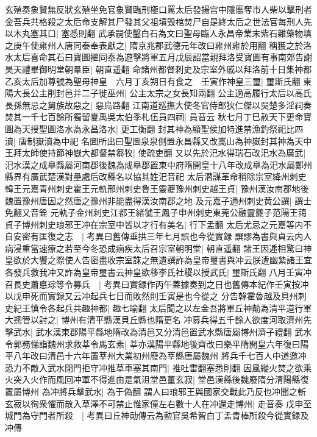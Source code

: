 玄殖奏象賢無反狀玄殖坐免官象賢臨刑極口罵太后發揚宫中隱慝奪市人柴以擊刑者金吾兵共格殺之太后命支解其尸發其父祖墳毁棺焚尸自是終太后之世法官每刑人先以木丸塞其口|{
	塞悉則翻}
武承嗣使鑿白石為文曰聖母臨人永昌帝業末紫石雜藥物填之庚午使雍州人唐同泰奉表獻之|{
	隋京兆郡武德元年改曰雍州雍於用翻}
稱獲之於洛水太后喜命其石曰寶圖擢同泰為遊擊將軍五月戊辰詔當親拜洛受寶圖有事南郊告謝昊天禮畢御明堂朝羣臣|{
	朝直遥翻}
命諸州都督刺史及宗室外戚以拜洛前十日集神都乙亥太后加尊號為聖母神皇　六月丁亥朔日有食之　壬寅作神皇三璽|{
	璽斯氏翻}
東陽大長公主削封邑并二子徙巫州|{
	公主太宗之女長知兩翻}
公主適高履行太后以高氏長孫無忌之舅族故惡之|{
	惡烏路翻}
江南道廵撫大使冬官侍郎狄仁傑以吳楚多淫祠奏焚其一千七百餘所獨留夏禹吳太伯季札伍員四祠|{
	員音云}
秋七月丁巳赦天下更命寶圖為天授聖圖洛水為永昌洛水|{
	更工衡翻}
封其神為顯聖侯加特進禁漁釣祭祀比四瀆|{
	唐制嶽瀆為中祀}
名圖所出曰聖圖泉泉側置永昌縣又改嵩山為神嶽封其神為天中王拜太師使持節神嶽大都督禁芻牧|{
	使疏吏翻}
又以先於汜水得瑞石改汜水為廣武|{
	汜水漢之成臯縣屬河南郡後魏為成臯郡置東中府隋開皇十八年改成臯為汜水屬鄭州縣界有廣武楚漢對壘處后改縣名以協其姓汜音祀}
太后潜謀革命稍除宗室絳州刺史韓王元嘉青州刺史霍王元軌邢州刺史魯王靈夔豫州刺史越王貞|{
	豫州漢汝南郡地後魏置豫州唐因之然唐之豫州非能盡得漢汝南郡之地}
及元嘉子通州刺史黄公譔|{
	譔士免翻又音銓}
元軌子金州刺史江都王緒虢王鳳子申州刺史東莞公融靈夔子范陽王藹貞子博州刺史琅邪王冲在宗室中皆以才行有美名|{
	行下孟翻}
太后尤忌之元嘉等内不自安密有匡復之志　|{
	考異曰舊傳垂拱三年七月誤也今從實録}
譔謬為書與貞云内人病浸重當速療之若至今冬恐成痼疾太后召宗室朝明堂|{
	朝直遥翻}
諸王因逓相驚曰神皇欲於大饗之際使人告密盡收宗室誅之無遺譔詐為皇帝璽書與冲云朕遭幽縶諸王宜各發兵救我冲又詐為皇帝璽書云神皇欲移李氏社稷以授武氏|{
	璽斯氏翻}
八月壬寅冲召長史蕭悳琮等令募兵　|{
	考異曰實録作丙午蓋據奏到之日也舊傳本紀作壬寅按冲以戊申死而實録又云冲起兵七日而敗然則壬寅是也今從之}
分告韓霍魯越及貝州刺史紀王慎令各起兵共趣神都|{
	趣七喻翻}
太后聞之以左金吾將軍丘神勣為清平道行軍大摠管以討之|{
	博州有清平縣漢貝丘縣也隋更名}
冲募兵得五千餘人欲度河取濟州先擊武水|{
	武水漢東郡陽平縣地隋改為清邑又分清邑置武水縣唐屬博州濟子禮翻}
武水令郭務悌詣魏州求救莘令馬玄素|{
	莘亦漢陽平縣地後齊改曰樂平隋開皇六年復曰陽平八年改曰清邑十六年置莘州大業初州廢為莘縣唐屬魏州}
將兵千七百人中道邀冲恐力不敵入武水閉門拒守冲推草車塞其南門|{
	推吐雷翻塞悉則翻}
因風縱火焚之欲乘火突入火作而風回冲軍不得進由是氣沮堂邑董玄寂|{
	堂邑漢縣後魏廢隋分清陽縣復置屬博州}
為冲將兵擊武水|{
	為于偽翻}
謂人曰琅邪王與國家交戰此乃反也冲聞之斬玄寂以徇衆懼而散入草澤不可禁止惟家僮左右數十人在冲還走博州|{
	走音奏}
戊申至城門為守門者所殺　|{
	考異曰丘神勣傳云為勲官吳希智白丁孟青棒所殺今從實録及冲傳}
